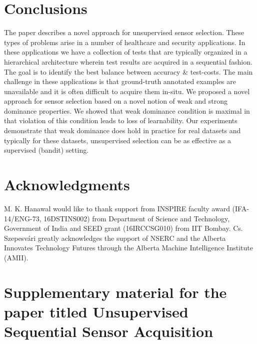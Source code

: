 \documentclass[10pt]{article}
\newcommand{\ses}{sensor selection\xspace}
\begin{document}
\section{Conclusions}
\label{sec:Conclu}
%
\vspace{-10pt}
The paper describes a novel approach for unsupervised \ses. These types of problems arise in a number of healthcare and security applications. In these applications we have a collection of tests that are typically organized in a hierarchical architecture wherein test results are acquired in a sequential fashion. The goal is to identify the best balance between accuracy \& test-costs. The main challenge in these applications is that ground-truth annotated examples are unavailable and it is often difficult to acquire them in-situ. We proposed a novel approach for \ses based on a novel notion of weak and strong dominance properties. We showed that weak dominance condition is maximal in that violation of this condition leads to loss of learnability. Our experiments demonstrate that weak dominance does hold in practice for real datasets and typically for these datasets, unsupervised selection can be as effective as a supervised (bandit) setting. 

\section*{Acknowledgments}
\label{sec:Ack}
M. K. Hanawal would like to thank support from INSPIRE faculty award (IFA-14/ENG-73, 16DSTINS002) from Department of Science and Technology, Government of India and SEED grant (16IRCCSG010) from IIT Bombay. 
Cs. Szepesv\'ari greatly acknowledges the support of NSERC and the Alberta Innovates Technology Futures through the Alberta  Machine Intelligence Institute (AMII).
%



\newpage
\section*{\large Supplementary material for the paper titled Unsupervised Sequential Sensor Acquisition}
\hrulefill \hrulefill
\hrulefill
\fi


\end{document}
